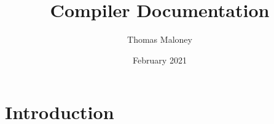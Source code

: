 \documentclass{article}
\title{Compiler Documentation}
\author{Thomas Maloney}
\date{February 2021}
\begin{document}
\maketitle

\section{Introduction}
\end{document}

